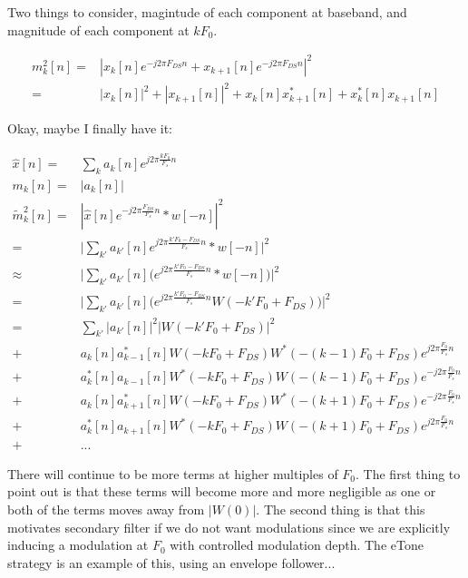 \documentclass [11pt, proquest] {uwthesis}[2015/03/03]
\begin{document}
Two things to consider, magintude of each component at baseband, and magnitude of each component at $k F_0$.

\begin{align}
m_k^2[n] =& | x_k[n] e^{-j2\pi F_{DS} n} +  x_{k+1}[n] e^{-j2\pi F_{DS} n}|^2 \nonumber \\
=& | x_k[n] |^2 + | x_{k+1}[n] |^2 + x_k[n]x_{k+1}^*[n]  + x_k^*[n]x_{k+1}[n]
\end{align}



Okay, maybe I finally have it:


\begin{align}
\widehat{x}[n] =& \sum_k a_k[n] e^{j2\pi \frac{kF_0}{F_s} n} \\
m_k[n] =& | a_k[n]| \\
\tilde{m}_k^2[n] =&  | \widehat{x}[n] e^{-j2\pi \frac{F_{DS}}{F_s} n} * w[-n] |^2 \nonumber \\
=& \Big| \sum_{k'} a_{k'}[n] e^{j2\pi \frac{k'F_0 - F_{DS}}{F_s} n}* w[-n] \Big|^2 \nonumber \\
\approx& \Big| \sum_{k'} a_{k'}[n] \Big( e^{j2\pi \frac{k'F_0 - F_{DS}}{F_s} n}* w[-n] \Big) \Big|^2 \nonumber \\
=& \Big| \sum_{k'} a_{k'}[n] \Big( e^{j2\pi \frac{k'F_0 - F_{DS}}{F_s} n} W(-k'F_0 + F_{DS}) \Big) \Big|^2 \nonumber \\
=& \sum_{k'} | a_{k'}[n]|^2 |W(-k'F_0 + F_{DS})|^2 \\
+& a_k[n]a_{k-1}^*[n]W(-kF_0 + F_{DS})W^*(-(k-1)F_0 + F_{DS}) e^{j2\pi \frac{F_0}{F_s} n} \nonumber \\
+& a_k^*[n]a_{k-1}[n]W^*(-kF_0 + F_{DS})W(-(k-1)F_0 + F_{DS}) e^{-j2\pi \frac{F_0}{F_s} n}\nonumber \\
+& a_k[n]a_{k+1}^*[n]W(-kF_0 + F_{DS})W^*(-(k+1)F_0 + F_{DS})e^{-j2\pi \frac{F_0}{F_s} n} \nonumber \\
+& a_k^*[n]a_{k+1}[n]W^*(-kF_0 + F_{DS})W(-(k+1)F_0 + F_{DS})e^{j2\pi \frac{F_0}{F_s} n} \nonumber \\
+& ...
\end{align}

There will continue to be more terms at higher multiples of $F_0$.  The first thing to point out is that these terms will become more and more negligible as one or both of the terms moves away from $|W(0)|$.  The second thing is that this motivates secondary filter if we do not want modulations since we are explicitly inducing a modulation at $F_0$ with controlled modulation depth.  The eTone strategy is an example of this, using an envelope follower...
\end{document}
